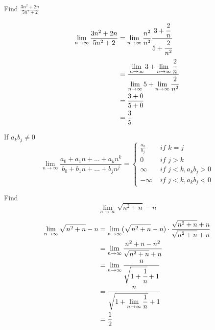 
\begin{exmp}
Find $\displaystyle \frac{3n^2+2n}{5n^2+2}$
\end{exmp}

\begin{solution}
\begin{align*}
    \lim_{n\to\infty} \frac{3n^2+2n}{5n^2+2}& = \lim_{n\to\infty} \frac{n^2}{n^2}\frac{3+\cfrac{2}{n}}{5+\cfrac{2}{n^2}}\\
    & = \frac{\displaystyle\lim_{n\to\infty} 3 + \lim_{n\to\infty} \cfrac{2}{n}}{\displaystyle\lim_{n\to\infty} 5 + \lim_{n\to\infty} \cfrac{2}{n^2}}\\
     & = \frac{3+0}{5+0} \\ 
     & = \frac{3}{5}
\end{align*}
\end{solution}

\begin{note}
If $a_kb_j\neq 0$
\begin{equation*}
    \lim_{n\to\infty} \frac{a_0+a_1n+\dots + a_kn^k}{b_0+b_1n+\dots + b_jn^j} = 
    \begin{cases}
        \displaystyle \frac{a_k}{b_j}  &  \textit{ if } k = j\\
        0 & \textit{ if } j>k\\
        \infty & \textit{ if } j<k, a_kb_j>0 \\
     -\infty & \textit{ if } j<k, a_kb_j<0 
    \end{cases}
\end{equation*}
\end{note}

\begin{exmp}
Find \[
\lim_{n\to\infty} \sqrt{n^2+n}-n\]
\end{exmp}

\begin{solution}
\begin{align*}
    \lim_{n\to\infty} \sqrt{n^2+n}-n &= 
    \lim_{n\to\infty} (\sqrt{n^2+n}-n)\cdot \frac{\sqrt{n^2+n}+n}{\sqrt{n^2+n}+n}\\
    & = \lim_{n\to\infty} \frac{n^2+n-n^2}{\sqrt{n^2+n}+n} \\
    & = \lim_{n\to\infty} \frac{n}{\sqrt{1+\cfrac{1}{n}}+1} \\ 
    & = \frac{n}{\sqrt{1+\displaystyle\lim_{n\to\infty}\frac{1}{n}}+1}\\
    & = \frac{1}{2}
\end{align*}
\end{solution}

